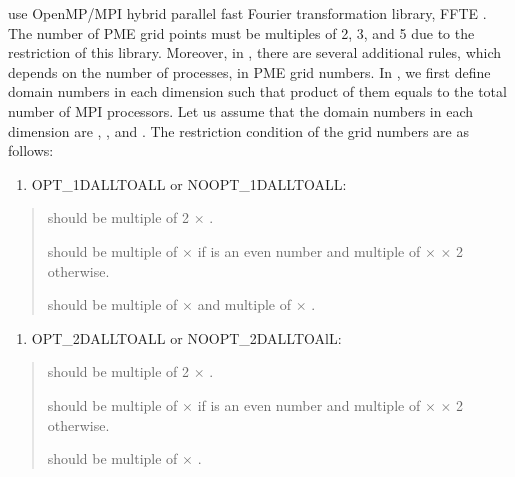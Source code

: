 \documentclass[a4paper,11pt,oneside,english]{sphinxmanual}
\begin{document}
 use OpenMP/MPI hybrid parallel fast Fourier transformation library, FFTE .
The number of PME grid points must be multiples of 2, 3, and 5 due to the restriction of this library.
Moreover, in , there are several additional rules, which depends on the number of processes, in PME grid numbers.
In , we first define domain numbers in each dimension such that product of them equals to the total number of
MPI processors. Let us assume that the domain numbers in each dimension are
, , and . The restriction condition of the grid numbers are as follows:
\begin{enumerate}
\def\theenumi{\arabic{enumi}}
\def\labelenumi{\theenumi )}
\makeatletter\def\p@enumii{\p@enumi \theenumi )}\makeatother
\item {} 
OPT\_1DALLTOALL or NOOPT\_1DALLTOALL:

\end{enumerate}
\begin{quote}

 should be multiple of 2 \(\times\) .

 should be multiple of  \(\times\)  if  is an even number and multiple of  \(\times\)  \(\times\) 2 otherwise.

 should be multiple of  \(\times\)  and multiple of  \(\times\) .
\end{quote}
\begin{enumerate}
\def\theenumi{\arabic{enumi}}
\def\labelenumi{\theenumi )}
\makeatletter\def\p@enumii{\p@enumi \theenumi )}\makeatother
\setcounter{enumi}{1}
\item {} 
OPT\_2DALLTOALL or NOOPT\_2DALLTOAlL:

\end{enumerate}
\begin{quote}

 should be multiple of 2 \(\times\) .

 should be multiple of  \(\times\)  if  is an even number and multiple of  \(\times\)  \(\times\) 2 otherwise.

 should be multiple of  \(\times\) .
\end{quote}
\end{document}
